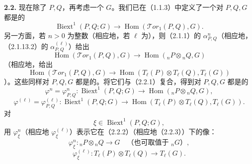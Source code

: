 \textbf{2.2.} 现在除了 $P,Q$，再考虑一个 $G$。我们已在（1.1.3）中定义了一个对 $P,Q,G$ 都是的
\[\operatorname{Biext}^1(P,Q;G)\longrightarrow\operatorname{Hom}(\mathcal Tor_1(P,Q),G).\tag{2.2.1}\]
另一方面，若 $n>0$ 为整数（相应地，若 $\ell$ 为），则（2.1.1）的 $\alpha^n_{P,Q}$（相应地，（2.1.13.2）的 $\alpha^{(\ell)}_{P,Q}$）给出
\[\operatorname{Hom}(\mathcal Tor_1(P,Q),G)\longrightarrow\operatorname{Hom}({}_nP\otimes{}_nQ,G)\]
（相应地，给出
\[\operatorname{Hom}(\mathcal Tor_1(P,Q),G)\longrightarrow
\operatorname{Hom}(T_\ell(P)\otimes T_\ell(Q),T_\ell(G))\]
）。这些同样对 $P,Q,G$ 都是的。将它们与（2.2.1）复合，得到对 $P,Q,G$ 都是的
\[\varphi^n=\varphi^n_{P,Q}:\operatorname{Biext}^1(P,Q;G)\longrightarrow
\operatorname{Hom}({}_nP\otimes{}_nQ,G),\tag{2.2.2}\]
\[\varphi^{(\ell)}=\varphi^{(\ell)}_{P,Q}:\operatorname{Biext}^1(P,Q;G)\longrightarrow
\operatorname{Hom}(T_\ell(P)\otimes T_\ell(Q),T_\ell(G)).\tag{2.2.3}\]
对
\[\xi\in\operatorname{Biext}^1(P,Q;G),\tag{2.2.4}\]
用 $\varphi_\xi^n$（相应地 $\varphi_\xi^{(\ell)}$）表示它在（2.2.2）（相应地（2.2.3））下的像：
\[\varphi_\xi^n:{}_nP\otimes{}_nQ\longrightarrow G\quad\text{（也可取值于 }{}_nG\text{）},\tag{2.2.5}\]
\[\varphi_\xi^{(\ell)}:T_\ell(P)\otimes T_\ell(Q)\longrightarrow T_\ell(G).\tag{2.2.6}\]

